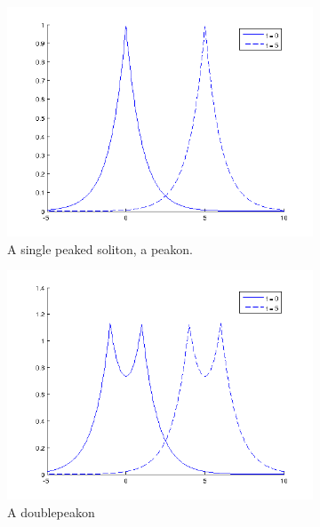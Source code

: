 \begin{figure}[h]
        \centering
        \begin{subfigure}[b]{0.49\textwidth}
                \includegraphics[width=\textwidth]{gfx/peakon}
                \caption{A single peaked soliton, a peakon.}
                \label{fig:peakon}
        \end{subfigure}
        \begin{subfigure}[b]{0.49\textwidth}
                \includegraphics[width=\textwidth]{gfx/doublepeakon}
                \caption{A doublepeakon}
                \label{fig:doublepeakon}
        \end{subfigure}
        \begin{subfigure}[b]{0.49\textwidth}

\end{subfigure}
\end{figure}
